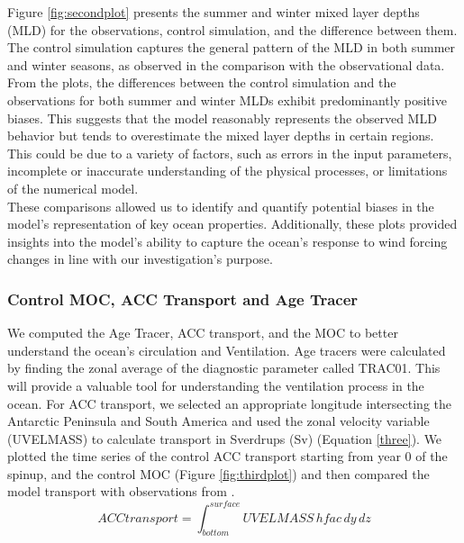 \documentclass[12pt]{article}
\begin{document}
\noindent Figure \ref{fig:secondplot} presents the summer and winter mixed layer depths (MLD) for the observations, control simulation, and the difference between them. The control simulation captures the general pattern of the MLD in both summer and winter seasons, as observed in the comparison with the observational data. From the plots, the differences between the control simulation and the observations for both summer and winter MLDs exhibit predominantly positive biases. This suggests that the model reasonably represents the observed MLD behavior but tends to overestimate the mixed layer depths in certain regions. This could be due to a variety of factors, such as errors in the input parameters, incomplete or inaccurate understanding of the physical processes, or limitations of the numerical model. \\

\noindent These comparisons allowed us to identify and quantify potential biases in the model's representation of key ocean properties. Additionally, these plots provided insights into the model's ability to capture the ocean's response to wind forcing changes in line with our investigation's purpose.




\subsubsection{Control MOC, ACC Transport and Age Tracer}\label{sec:CAA}
We computed the Age Tracer,  ACC transport, and the MOC to better understand the ocean's circulation and Ventilation. Age tracers were calculated by finding the zonal average of the diagnostic parameter called TRAC01. This will provide a valuable tool for understanding the ventilation process in the ocean. For ACC transport, we selected an appropriate longitude intersecting the Antarctic Peninsula and South America and used the zonal velocity variable (UVELMASS) to calculate transport in Sverdrups (Sv) (Equation \ref{three}). We plotted the time series of the control ACC transport starting from year 0 of the spinup, and the control MOC (Figure \ref{fig:thirdplot}) and then compared the model transport with observations from \citep{donohue2016mean}. 
\begin{equation}\label{three}
\mathit{ACCtransport}=\int_{\mathit{bottom}}^{\mathit{surface}}UVELMASS\, \mathit{hfac} \,dy\,dz
\end{equation}  \\
\end{document}

